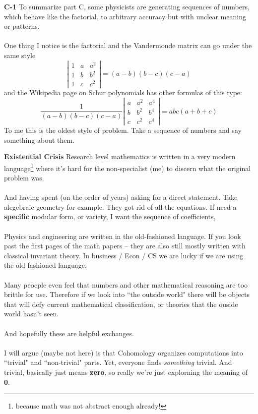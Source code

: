 \documentclass[12pt]{article}
\begin{document}
\newpage

\noindent \textbf{C-1} To summarize part C, some physicists are generating sequences of numbers, which behave like the factorial, to arbitrary accuracy but with unclear meaning or patterns.  \\ \\
One thing I notice is the factorial and the Vandermonde matrix can go under the same style
$$
\left| \begin{array}{ccc} 1 & a & a^2 \\ 
1 & b & b^2 \\ 
1 & c & c^2 \end{array} \right|
 = (a-b)(b-c)(c-a)
 $$
and the Wikipedia page on Schur polynomials has other formulas of this type:
$$
\frac{1}{(a-b)(b-c)(c-a)} \left| \begin{array}{ccc} a & a^2 & a^4 \\ 
b & b^2 & b^4 \\ 
c & c^2 & c^4 \end{array} \right|
 = abc (a+b+c)
 $$
To me this is the oldest style of problem.  Take a sequence of numbers and say something about them.
 
\newpage

\noindent \textbf{Existential Crisis}  Research level mathematics is written in a very modern language\footnote{because math was not abstract enough already!} where it's hard for the non-specialist (me) to discern what the original problem was.  \\ \\
And having spent (on the order of years) asking for a direct statement.  Take alegebraic geometry for example.  They got rid of all the equations.  If need a \textbf{specific} modular form, or variety, I want the sequence of coefficients,  \\ \\
Physics and engineering are written in the old-fashioned language.  If you look past the first pages of the math papers -- they are also still mostly written with classical invariant theory.  In business / Econ / CS we are lucky if we are using the old-fashioned language.  \\ \\ Many peoeple even feel that numbers and other mathematical reasoning are too brittle for use.  Therefore if we look into ``the outside world" there will be objects that will defy current mathematical classification, or theories that the ouside world hasn't seen. \\ \\
And hopefully these are helpful exchanges.  \\ \\ I will argue (maybe not here) is that Cohomology organizes computations into ``trivial" and ``non-trivial" parts.  Yet, everyone finds \textit{ something }  trivial.  And trivial, basically just means \textbf{zero}, so really we're just explorning the meaning of \textbf{0}.
\end{document}
